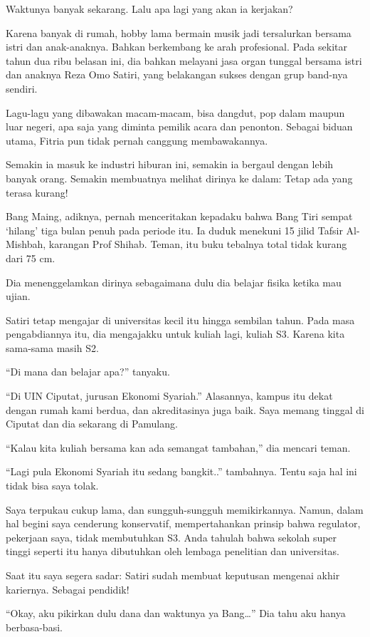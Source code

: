 Waktunya banyak sekarang. Lalu apa lagi yang akan ia kerjakan?

Karena banyak di rumah, hobby lama bermain musik jadi tersalurkan bersama istri dan anak-anaknya. Bahkan berkembang ke arah profesional. Pada sekitar tahun dua ribu belasan ini, dia bahkan melayani jasa organ tunggal bersama istri dan anaknya Reza Omo Satiri, yang belakangan sukses dengan grup band-nya sendiri.

Lagu-lagu yang dibawakan macam-macam, bisa dangdut, pop dalam maupun luar negeri, apa saja yang diminta pemilik acara dan penonton. Sebagai biduan utama, Fitria pun tidak pernah canggung membawakannya.

Semakin ia masuk ke industri hiburan ini, semakin ia bergaul dengan lebih banyak orang. Semakin membuatnya melihat dirinya ke dalam: Tetap ada yang terasa kurang!

Bang Maing, adiknya, pernah menceritakan kepadaku bahwa Bang Tiri sempat ‘hilang’ tiga bulan penuh pada periode itu. Ia duduk menekuni 15 jilid Tafsir Al-Mishbah, karangan Prof Shihab. Teman, itu buku tebalnya total tidak kurang dari 75 cm.

Dia menenggelamkan dirinya sebagaimana dulu dia belajar fisika ketika mau ujian.

Satiri tetap mengajar di universitas kecil itu hingga sembilan tahun. Pada masa pengabdiannya itu, dia mengajakku untuk kuliah lagi, kuliah S3. Karena kita sama-sama masih S2.

“Di mana dan belajar apa?” tanyaku.

“Di UIN Ciputat, jurusan Ekonomi Syariah.” Alasannya, kampus itu dekat dengan rumah kami berdua, dan akreditasinya juga baik. Saya memang tinggal di Ciputat dan dia sekarang di Pamulang.

“Kalau kita kuliah bersama kan ada semangat tambahan,” dia mencari teman.

“Lagi pula Ekonomi Syariah itu sedang bangkit..” tambahnya. Tentu saja hal ini tidak bisa saya tolak.

Saya terpukau cukup lama, dan sungguh-sungguh memikirkannya. Namun, dalam hal begini saya cenderung konservatif, mempertahankan prinsip bahwa regulator, pekerjaan saya, tidak membutuhkan S3. Anda tahulah bahwa sekolah super tinggi seperti itu hanya dibutuhkan oleh lembaga penelitian dan universitas.

Saat itu saya segera sadar: Satiri sudah membuat keputusan mengenai akhir kariernya. Sebagai pendidik!

“Okay, aku pikirkan dulu dana dan waktunya ya Bang…” Dia tahu aku hanya berbasa-basi.

